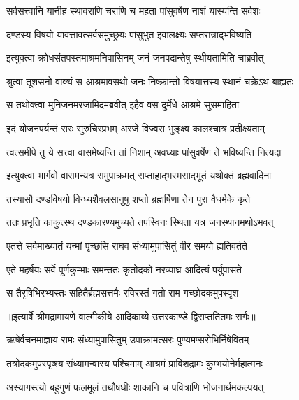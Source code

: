 \twolineshloka
{सर्वसत्त्वानि यानीह स्थावराणि चराणि च}
{महता पांसुवर्षेण नाशं यास्यन्ति सर्वशः} %

\twolineshloka
{दण्डस्य विषयो यावत्तावत्सर्वसमुच्छ्रयः}
{पांसुभुत इवालक्ष्यः सप्तरात्राद्भविष्यति} %

\twolineshloka
{इत्युक्त्वा क्रोधसंतपस्तमाश्रमनिवासिनम्}
{जनं जनपदान्तेषु स्थीयतामिति चाब्रवीत्} %

\twolineshloka
{श्रुत्वा तूशसनो वाक्यं स आश्रमावसथो जनः}
{निष्क्रान्तो विषयात्तस्य स्थानं चक्रेऽथ बाह्यतः} %

\twolineshloka
{स तथोक्त्वा मुनिजनमरजामिदमब्रवीत्}
{इहैव वस दुर्मेधे आश्रमे सुसमाहिता} %

\twolineshloka
{इदं योजनपर्यन्तं सरः सुरुचिरप्रभम्}
{अरजे विज्वरा भुङ्क्ष्व कालश्चात्र प्रतीक्ष्यताम्} %

\twolineshloka
{त्वत्समीपे तु ये सत्त्वा वासमेष्यन्ति तां निशाम्}
{अवध्याः पांसुवर्षेण ते भविष्यन्ति नित्यदा} %

\twolineshloka
{इत्युक्त्वा भार्गवो वासमन्यत्र समुपाक्रमत्}
{सप्ताहाद्भस्मसाद्भूतं यथोक्तं ब्रह्मवादिना} %

\twolineshloka
{तस्यासौ दण्डविषयो विन्ध्यशैवलसानुषु}
{शप्तो ब्रह्मर्षिणा तेन पुरा वैधर्मके कृते} %

\twolineshloka
{ततः प्रभृति काकुत्स्थ दण्डकारण्यमुच्यते}
{तपस्विनः स्थिता यत्र जनस्थानमथोऽभवत्} %

\twolineshloka
{एतत्ते सर्वमाख्यातं यन्मां पृच्छसि राघव}
{संध्यामुपासितुं वीर समयो ह्यतिवर्तते} %

\twolineshloka
{एते महर्षयः सर्वे पूर्णकुम्भाः समन्ततः}
{कृतोदको नरव्याघ्र आदित्यं पर्युपासते} %

\twolineshloka
{स तैरृषिभिरभ्यस्तः सहितैर्ब्रह्मसत्तमैः}
{रविरस्तं गतो राम गच्छोदकमुपस्पृश} %


{॥इत्यार्षे श्रीमद्रामायणे वाल्मीकीये आदिकाव्ये उत्तरकाण्डे द्विसप्ततितमः सर्गः॥}


\twolineshloka
{ऋषेर्वचनमाज्ञाय रामः संध्यामुपासितुम्}
{उपाक्रामत्सरः पुण्यमप्सरोभिर्निषेवितम्} %

\twolineshloka
{तत्रोदकमुपस्पृष्श्य संध्यामन्वास्य पश्चिमाम्}
{आश्रमं प्राविशद्रामः कुम्भयोनेर्महात्मनः} %

\twolineshloka
{अस्यागस्त्यो बहुगुणं फलमूलं तथौषधीः}
{शाकानि च पवित्राणि भोजनार्थमकल्पयत्} %

